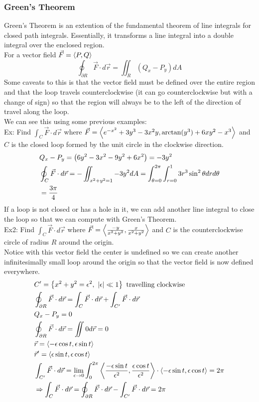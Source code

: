 \documentclass[11pt, fleqn]{article}
\begin{document}
\subsubsection{Green's Theorem}
Green's Theorem is an extention of the fundamental theorem of line integrals for closed path integrals. Essentially, it transforms a line integral into a double integral over the enclosed region.\\
For a vector field $\vec{F}=\left\langle P,Q \right\rangle$
$$\oint_{\partial R}\vec{F}\cdot d\vec{r}=\iint_R(Q_x-P_y)dA$$
Some caveats to this is that the vector field must be defined over the entire region and that the loop travels counterclockwise (it can go counterclockwise but with a change of sign) so that the region will always be to the left of the direction of travel along the loop.\\
We can see this using some previous examples:\\
Ex: Find $\int_C\vec{F}\cdot d\vec{r}$ where $\vec{F}=\left\langle e^{-x^2}+3y^3-3x^2y,\arctan(y^3)+6xy^2-x^3 \right\rangle$ and $C$ is the closed loop formed by the unit circle in the clockwise direction.
\begin{align*}
    &Q_x-P_y=\left( 6y^2-3x^2-9y^2+6x^2 \right)=-3y^2\\
    &\oint_C\vec{F}\cdot d\vec{r}=-\iint_{x^2+y^2=1}-3y^2dA=\int_{\theta=0}^{2\pi}\int_{r=0}^13r^3\sin^2\theta drd\theta\\
    &=\frac{3\pi}{4}
\end{align*}
If a loop is not closed or has a hole in it, we can add another line integral to close the loop so that we can compute with Green's Theorem.\\
Ex2: Find $\int_C\vec{F}\cdot d\vec{r}$ where $\vec{F}=\left\langle \frac{-y}{x^2+y^2},\frac{x}{x^2+y^2} \right\rangle$ and $C$ is the counterclockwise circle of radius $R$ around the origin.\\
Notice with this vector field the center is undefined so we can create another infinitesimally small loop around the origin so that the vector field is now defined everywhere.
\begin{align*}
    &C'=\left\{ x^2+y^2=\epsilon^2,\ |\epsilon|\ll1 \right\}\text{ travelling clockwise}\\
    &\oint_{\partial R}\vec{F}\cdot d\vec{r}=\int_C\vec{F}\cdot d\vec{r}+\int_{C'}\vec{F}\cdot d\vec{r}\\
    &Q_x-P_y=0\\
    &\oint_{\partial R}\vec{F}\cdot d\vec{r}=\iint 0 d\vec{r}=0\\
    &\vec{r}=\left\langle -\epsilon\cos t,\epsilon\sin t \right\rangle\\
    &\vec{r}'=\left\langle \epsilon\sin t,\epsilon\cos t \right\rangle\\
    &\int_{C'}\vec{F}\cdot d\vec{r}=\lim_{\epsilon\to0}\int_0^{2\pi}\left\langle \frac{-\epsilon\sin t}{\epsilon^2},\frac{\epsilon\cos t}{\epsilon^2} \right\rangle\cdot\left\langle -\epsilon\sin t,\epsilon\cos t \right\rangle=2\pi\\
    &\Rightarrow \int_C\vec{F}\cdot d\vec{r}=\oint_{\partial R}\vec{F}\cdot d\vec{r}-\int_{C'}\vec{F}\cdot d\vec{r}=2\pi
\end{align*}
\end{document}
